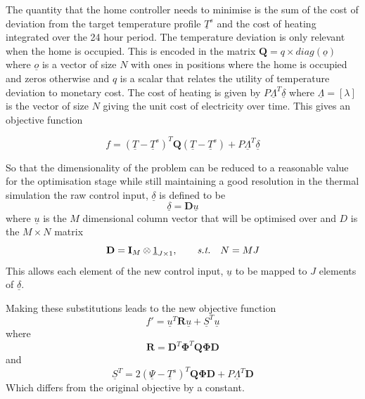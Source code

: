 \documentclass[a4paper, 10 pt, conference]{ieeeconf}  %
\begin{document}
The quantity that the home controller needs to minimise is the sum of the cost of deviation from the target temperature profile $\underline{T}^s$ and the cost of heating integrated over the 24 hour period. The temperature deviation is only relevant when the home is occupied. This is encoded in the matrix $\mathbf{Q}=q \times diag(\underline{o})$ where $\underline{o}$ is a vector of size $N$ with ones in positions where the home is occupied and zeros otherwise and $q$ is a scalar that relates the utility of temperature deviation to monetary cost. The cost of heating is given by $P\underline{\Lambda}^{T} \underline{\delta}$ where $\underline{\Lambda}=[ \lambda ]$ is the vector of size $N$ giving the unit cost of electricity over time. This gives an objective function

\begin{equation}
f = (\underline{T}-\underline{T}^s)^{T}\mathbf{Q}(\underline{T}-\underline{T}^s)+P\underline{\Lambda}^{T} \underline{\delta}
\end{equation}

So that the dimensionality of the problem can be reduced to a reasonable value for the optimisation stage while still maintaining a good resolution in the thermal simulation the raw control input, $\underline{\delta}$ is defined to be
\begin{equation}
\underline{\delta}=\mathbf{D}\underline{u}
\end{equation}
where $\underline{u}$ is the $M$ dimensional column vector that will be optimised over and $D$ is the $M\times N$ matrix
\begin{equation}
\label{quadthermodimension}
\mathbf{D}=\mathbf{I}_{M} \otimes \underline{1}_{J \times 1},\qquad \emph{s.t.} \quad N=MJ
\end{equation}
This allows each element of the new control input, $\underline{u}$ to be mapped to $J$ elements of $\underline{\delta}$.

Making these substitutions leads to the new objective function
\begin{equation}
\label{furuus}
f'=\underline{u}^{T}\mathbf{R}\underline{u}+\underline{S}^{T}\underline{u}
\end{equation}
where
\begin{equation}
\mathbf{R}=\mathbf{D}^{T}\boldsymbol{\Phi}^{T}\mathbf{Q}\boldsymbol{\Phi}\mathbf{D}
\end{equation}
and
\begin{equation}
\underline{S}^{T}=2(\underline{\Psi}-\underline{T}^s)^{T}\mathbf{Q}\boldsymbol{\Phi}\mathbf{D}+P\underline{\Lambda}^{T} \mathbf{D}
\end{equation}
Which differs from the original objective by a constant.
\end{document}

